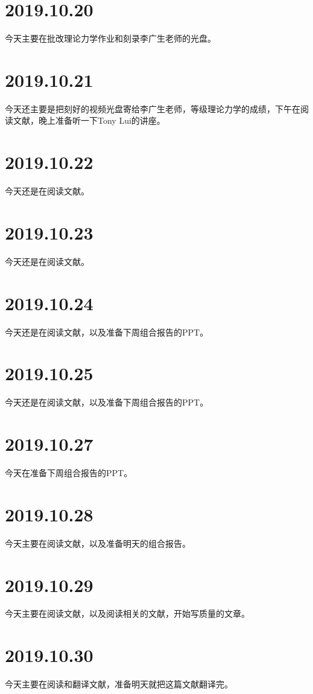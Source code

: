 \section{2019.10.20}
今天主要在批改理论力学作业和刻录李广生老师的光盘。

\section{2019.10.21}
今天还主要是把刻好的视频光盘寄给李广生老师，等级理论力学的成绩，下午在阅读文献\cite{RN1176}，晚上准备听一下Tony Lui的讲座。

\section{2019.10.22}
今天还是在阅读文献\cite{RN1176}。

\section{2019.10.23}
今天还是在阅读文献\cite{RN1176}。

\section{2019.10.24}
今天还是在阅读文献\cite{RN1176}，以及准备下周组合报告的PPT。

\section{2019.10.25}
今天还是在阅读文献\cite{RN1176}，以及准备下周组合报告的PPT。

\section{2019.10.27}
今天在准备下周组合报告的PPT。

\section{2019.10.28}
今天主要在阅读文献\cite{RN1176}，以及准备明天的组合报告。

\section{2019.10.29}
今天主要在阅读文献\cite{RN1176}，以及阅读相关的文献，开始写质量的文章。

\section{2019.10.30}
今天主要在阅读和翻译文献\cite{RN1176}，准备明天就把这篇文献翻译完。

